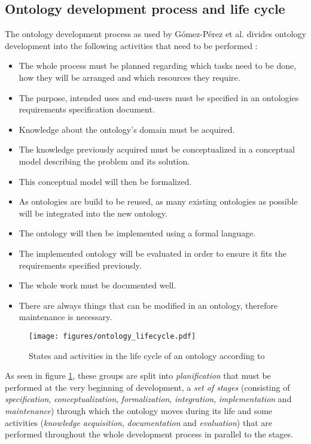 \subsection{Ontology development process and life cycle}

The ontology development process as used by Gómez-Pérez et al. divides ontology development into the following activities that need to be performed \cite{Methontology}:

\begin{itemize}
  \item The whole process must be planned regarding which tasks need to be done, how they will be arranged and which resources they require.
  \item The purpose, intended uses and end-users must be specified in an ontologies requirements specification document.
  \item Knowledge about the ontology's domain must be acquired.
  \item The knowledge previously acquired must be conceptualized in a conceptual model describing the problem and its solution.
  \item This conceptual model will then be formalized.
  \item As ontologies are build to be reused, as many existing ontologies as possible will be integrated into the new ontology.
  \item The ontology will then be implemented using a formal language.
  \item The implemented ontology will be evaluated in order to ensure it fits the requirements specified previously.
  \item The whole work must be documented well.
  \item There are always things that can be modified in an ontology, therefore maintenance is necessary.
\end{itemize}

\begin{figure}
  \texttt{[image: figures/ontology\_lifecycle.pdf]}
  \caption{States and activities in the life cycle of an ontology according to \methontology \cite{Methontology}}
  \label{fig:methontology1}
\end{figure}

As seen in figure \ref{fig:methontology1}, these groups are split into \emph{planification} that must be performed at the very beginning of development, a \emph{set of stages} (consisting of \emph{specification}, \emph{conceptualization}, \emph{formalization}, \emph{integration}, \emph{implementation} and \emph{maintenance}) through which the ontology moves during its life and some activities (\emph{knowledge acquisition}, \emph{documentation} and \emph{evaluation}) that are performed throughout the whole development process in parallel to the stages.


